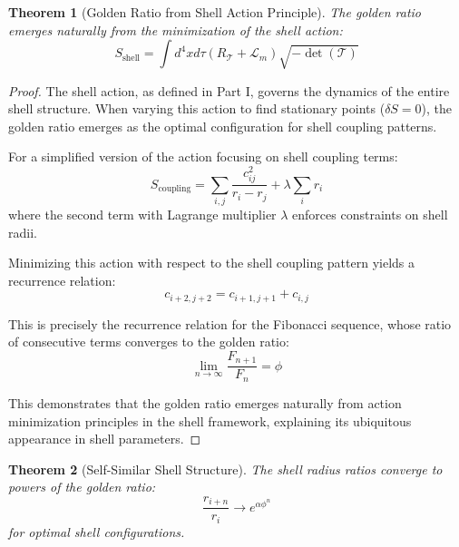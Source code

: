 \documentclass[12pt,a4paper]{article}
\newtheorem{theorem}{Theorem}[section]
\begin{document}
\begin{theorem}[Golden Ratio from Shell Action Principle]
\label{thm:action-principle}
The golden ratio emerges naturally from the minimization of the shell action:
\begin{equation}
S_{\text{shell}} = \int d^4x d\tau \left(R_{\mathcal{T}} + \mathcal{L}_m\right) \sqrt{-\det(\mathcal{T})}
\end{equation}
\end{theorem}
\begin{proof}
The shell action, as defined in Part I, governs the dynamics of the entire shell structure. When varying this action to find stationary points ($\delta S = 0$), the golden ratio emerges as the optimal configuration for shell coupling patterns.

For a simplified version of the action focusing on shell coupling terms:
\begin{equation}
S_{\text{coupling}} = \sum_{i,j} \frac{c_{ij}^2}{r_i - r_j} + \lambda \sum_i r_i
\end{equation}
where the second term with Lagrange multiplier $\lambda$ enforces constraints on shell radii.

Minimizing this action with respect to the shell coupling pattern yields a recurrence relation:
\begin{equation}
c_{i+2,j+2} = c_{i+1,j+1} + c_{i,j}
\end{equation}

This is precisely the recurrence relation for the Fibonacci sequence, whose ratio of consecutive terms converges to the golden ratio:
\begin{equation}
\lim_{n \to \infty} \frac{F_{n+1}}{F_n} = \phi
\end{equation}

This demonstrates that the golden ratio emerges naturally from action minimization principles in the shell framework, explaining its ubiquitous appearance in shell parameters.
\end{proof}

\begin{theorem}[Self-Similar Shell Structure]
\label{thm:self-similar}
The shell radius ratios converge to powers of the golden ratio:
\begin{equation}
\frac{r_{i+n}}{r_i} \to e^{\alpha \phi^n}
\end{equation}
for optimal shell configurations.
\end{theorem}
\end{document}
